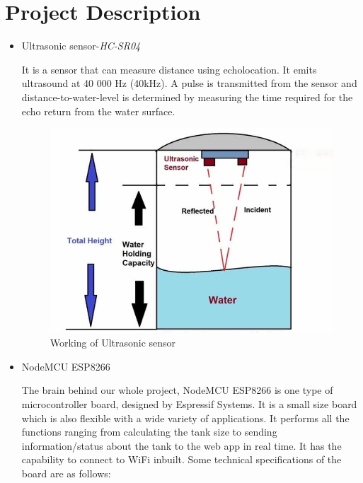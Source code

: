 \documentclass[12pt]{article}
\begin{document}
\section*{Project Description}
\normalsize
\begin{itemize}
 \item Ultrasonic sensor-\emph{HC-SR04}
  \vspace{0.025cm}
  
  It is a sensor that can measure distance using echolocation. It emits ultrasound at 40 000 Hz (40kHz). A pulse is transmitted from the sensor and distance-to-water-level is determined by measuring the time required for the echo return from the water surface.

\begin{figure}[H]
\centering
    \includegraphics[scale=0.35]{ULtrasonic_sensor.jpg}
    \caption{Working of Ultrasonic sensor}
    \label{fig:my_label}
\end{figure}


\item NodeMCU ESP8266
    \vspace{0.025cm}
    
  The brain behind our whole project, NodeMCU ESP8266 is one type of microcontroller board, designed by Espressif Systems. It is a small size board which is  also flexible with a wide variety of applications. It performs all the functions ranging from calculating the tank size to sending information/status about the tank to the web app in real time. It has the capability to connect to WiFi inbuilt. Some technical specifications of the board are as follows:
  \vspace{0.025cm}
  

\end{itemize}
\end{document}
